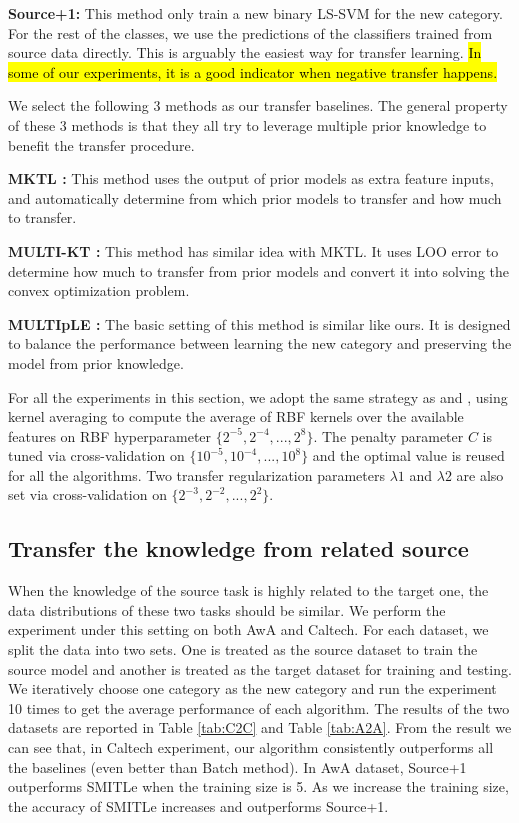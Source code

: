 \textbf{Source+1:} This method only train a new binary LS-SVM for the new category. For the rest of the classes, we use the predictions of the classifiers trained from source data directly. This is arguably the easiest way for transfer learning. \hl{In some of our experiments, it is a good indicator when negative transfer happens.}

We select the following 3 methods as our transfer baselines. The general property of these 3 methods is that they all try to leverage multiple prior knowledge to benefit the transfer procedure.

\textbf{MKTL \cite{jie2011multiclass}:} This method uses the output of prior models as extra feature inputs, and automatically determine from which prior models to transfer and how much to transfer.


\textbf{MULTI-KT \cite{tommasi2014learning}:} This method has similar idea with MKTL. It uses LOO error to determine how much to transfer from prior models and convert it into solving the convex optimization problem.

\textbf{MULTIpLE \cite{kuzborskij2013n}:} The basic setting of this method is similar like ours. It is designed to balance the performance between learning the new category and preserving the model from prior knowledge.

For all the experiments in this section, we adopt the same strategy as \cite{kuzborskij2013n} and \cite{tommasi2014learning}, using kernel averaging \cite{gehler2009feature} to compute the average of RBF kernels over the available features on RBF hyperparameter $\{2^{-5},2^{-4},...,2^8\}$. The penalty parameter $C$ is tuned via cross-validation on $\{10^{-5},10^{-4},...,10^8\}$ and the optimal value is reused for all the algorithms.
Two transfer regularization parameters $\lambda1$ and $\lambda2$ are also set via cross-validation on $\{2^{-3},2^{-2},...,2^2\}$.

\subsection{Transfer the knowledge from related source}
When the knowledge of the source task is highly related to the target one, the data distributions of these two tasks should be similar. 
We perform the experiment under this setting on both AwA and Caltech. For each dataset, we split the data into two sets. One is treated as the source dataset to train the source model and another is treated as the target dataset for training and testing. We iteratively choose one category as the new category and run the experiment 10 times to get the average performance of each algorithm. The results of the two datasets are reported in Table \ref{tab:C2C} and Table \ref{tab:A2A}. From the result we can see that, in Caltech experiment, our algorithm consistently outperforms all the baselines (even better than Batch method). In AwA dataset, Source+1 outperforms SMITLe when the training size is 5. As we increase the training size, the accuracy of SMITLe increases and outperforms Source+1.

